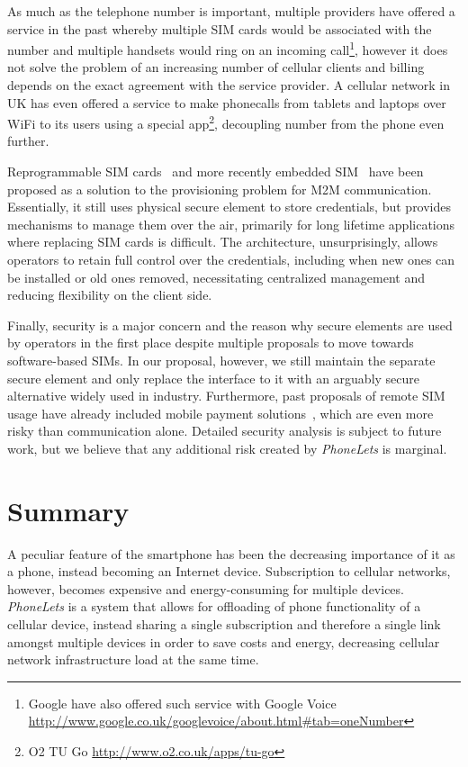 \documentclass{sig-alternate-10pt}
\begin{document}
As much as the telephone number is important, multiple providers have offered a service in the past whereby multiple SIM cards would be associated with the number and multiple handsets would ring on an incoming call\footnote{Google have also offered such service with Google Voice \url{http://www.google.co.uk/googlevoice/about.html\#tab=oneNumber}}, however it does not solve the problem of an increasing number of cellular clients and billing depends on the exact agreement with the service provider. A cellular network in UK has even offered a service to make phonecalls from tablets and laptops over WiFi to its users using a special app\footnote{O2 TU Go \url{http://www.o2.co.uk/apps/tu-go}}, decoupling number from the phone even further.

Reprogrammable SIM cards~\cite{OFcom:2012tx} and more recently embedded SIM~\cite{Association:2013ub} have been proposed as a solution to the provisioning problem for M2M communication. Essentially, it still uses physical secure element to store credentials, but provides mechanisms to manage them over the air, primarily for long lifetime applications where replacing SIM cards is difficult. The architecture, unsurprisingly, allows operators to retain full control over the credentials, including when new ones can be installed or old ones removed, necessitating centralized management and reducing flexibility on the client side.

Finally, security is a major concern and the reason why secure elements are used by operators in the first place despite multiple proposals to move towards software-based SIMs. In our proposal, however, we still maintain the separate secure element and only replace the interface to it with an arguably secure alternative widely used in industry. Furthermore, past proposals of remote SIM usage have already included mobile payment solutions~\cite{subramanian2003sim}, which are even more risky than communication alone. Detailed security analysis is subject to future work, but we believe that any additional risk created by \emph{PhoneLets} is marginal.

\section{Summary}

A peculiar feature of the smartphone has been the decreasing importance of it as a phone, instead becoming an Internet device. Subscription to cellular networks, however, becomes expensive and energy-consuming for multiple devices. \emph{PhoneLets} is a system that allows for offloading of phone functionality of a cellular device, instead sharing a single subscription and therefore a single link amongst multiple devices in order to save costs and energy, decreasing cellular network infrastructure load at the same time.
\end{document}
